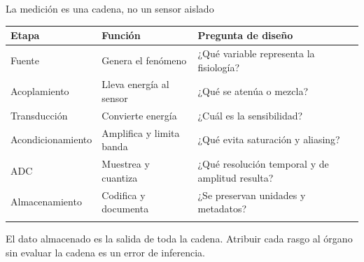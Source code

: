 \documentclass[
  ignorenonframetext,
  aspectratio=169,
  spanish,
  professionalfonts]{beamer}
\newcounter{none} %
\begin{document}
\begin{frame}[shrink]{La medición es una cadena, no un sensor aislado}
\protect{}\label{la-mediciuxf3n-es-una-cadena-no-un-sensor-aislado}
{\def\LTcaptype{none} %
\begin{longtable}[]{@{}
  >{\raggedright\arraybackslash}p{}
  >{\raggedright\arraybackslash}p{}
  >{\raggedright\arraybackslash}p{}@{}}
\toprule\noalign{}
\begin{minipage}[b]{\linewidth}\raggedright
Etapa
\end{minipage} & \begin{minipage}[b]{\linewidth}\raggedright
Función
\end{minipage} & \begin{minipage}[b]{\linewidth}\raggedright
Pregunta de diseño
\end{minipage} \\
\midrule\noalign{}
\endhead
Fuente & Genera el fenómeno & ¿Qué variable representa la fisiología? \\
Acoplamiento & Lleva energía al sensor & ¿Qué se atenúa o mezcla? \\
Transducción & Convierte energía & ¿Cuál es la sensibilidad? \\
Acondicionamiento & Amplifica y limita banda & ¿Qué evita saturación y
aliasing? \\
ADC & Muestrea y cuantiza & ¿Qué resolución temporal y de amplitud
resulta? \\
Almacenamiento & Codifica y documenta & ¿Se preservan unidades y
metadatos? \\
\bottomrule\noalign{}
\end{longtable}
}

\begin{tcolorbox}[enhanced jigsaw, arc=.35mm, bottomrule=.15mm, bottomtitle=1mm, breakable, colback=white, colbacktitle=quarto-callout-important-color!10!white, colframe=quarto-callout-important-color-frame, coltitle=black, left=2mm, leftrule=.75mm, opacityback=0, opacitybacktitle=0.6, rightrule=.15mm, title={Concepto principal}, titlerule=0mm, toprule=.15mm, toptitle=1mm]

El dato almacenado es la salida de toda la cadena. Atribuir cada rasgo
al órgano sin evaluar la cadena es un error de inferencia.

\end{tcolorbox}
\end{frame}
\end{document}
